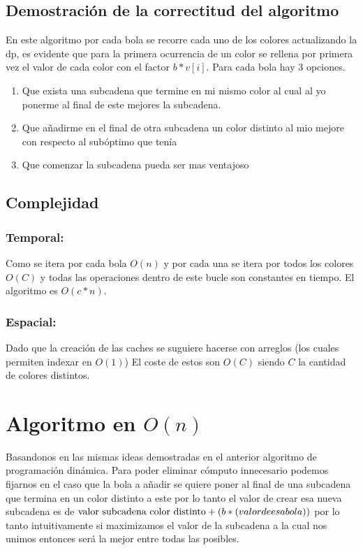 \documentclass{article}
\begin{document}
\subsection{Demostración de la correctitud del algoritmo}
En este algoritmo por cada bola se recorre cada uno de los colores actualizando la dp, es evidente que para la primera
ocurrencia de un color se rellena por primera vez el valor de cada color con el factor $b*v[i]$.
Para cada bola hay 3 opciones.
\begin{enumerate}
    \item Que exista una subcadena que termine en mi mismo color al cual al yo ponerme al final de este mejores la subcadena.
    \item Que añadirme en el final de otra subcadena un color distinto al mio mejore con respecto al subóptimo que tenía
    \item Que comenzar la subcadena pueda ser mas ventajoso
\end{enumerate}


\subsection{Complejidad}
\subsubsection{Temporal:}
Como se itera por cada bola $O(n)$ y por cada una se itera por todos los colores $O(C)$ y todas las operaciones dentro
de este bucle son constantes en tiempo. El algoritmo es $O(c*n)$.

\subsubsection{Espacial:}
Dado que la creación de las caches se suguiere hacerse con arreglos (los cuales permiten indexar en $O(1)$) 
El coste de estos son $O(C)$ siendo $C$ la cantidad de colores distintos.

\section*{Algoritmo en $O(n)$}
Basandonos en las mismas ideas demostradas en el anterior algoritmo de programación dinámica. 
Para poder eliminar cómputo innecesario podemos fijarnos en el caso que la bola a añadir se quiere poner al
final de una subcadena que termina en un color distinto a este por lo tanto el valor de crear esa nueva subcadena es de
$\text{valor subcadena color distinto}+(b*\text(valor de esa bola))$ por lo tanto intuitivamente si maximizamos el valor de la 
subcadena a la cual nos unimos entonces será la mejor entre todas las posibles.
\end{document}
